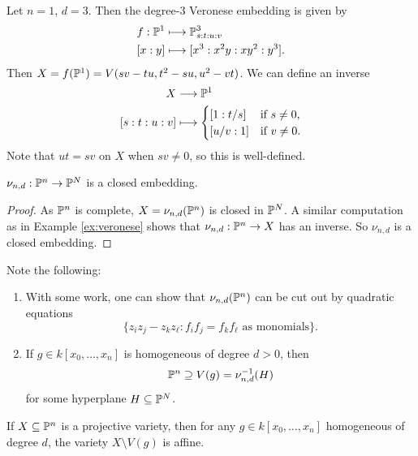 \begin{example}\label{ex:veronese}
  Let $n = 1$, $d = 3$. Then the degree-$3$
  Veronese embedding is given by
  \begin{align*}
    f : \mathbb{P}^1 &\longmapsto \mathbb{P}^3_{s : t : u : v} \\
    [x : y] &\longmapsto [x^3 : x^2y : xy^2 : y^3].
  \end{align*}
  Then $X = f(\mathbb{P}^1) = V(sv - tu, t^2 - su, u^2 - vt)$.
  We can define an inverse
  \begin{align*}
    X &\longrightarrow \mathbb{P}^1 \\
    [s : t : u : v] &\longmapsto
    \begin{cases}
      [1 : t / s] & \text{if } s \ne 0, \\
      [u / v : 1] & \text{if } v \ne 0.
    \end{cases}
  \end{align*}
  Note that $ut = sv$ on $X$ when
  $sv \ne 0$, so this is well-defined.
\end{example}

\begin{prop}
  $\nu_{n, d} : \mathbb{P}^n \to \mathbb{P}^N$ is a
  closed embedding.
\end{prop}

\begin{proof}
  As $\mathbb{P}^n$ is complete,
  $X = \nu_{n, d}(\mathbb{P}^n)$ is closed in
  $\mathbb{P}^N$. A similar computation as
  in Example \ref{ex:veronese} shows that
  $\nu_{n, d} : \mathbb{P}^n \to X$ has
  an inverse. So $\nu_{n, d}$ is a
  closed embedding.
\end{proof}

\begin{remark}
  Note the following:
  \begin{enumerate}
    \item With some work, one can show that
      $\nu_{n, d}(\mathbb{P}^n)$ can be cut out
      by quadratic equations
      \[
        \{
          z_i z_j - z_k z_\ell :
          f_i f_j = f_k f_\ell
          \text{ as monomials}
        \}.
      \]
    \item If $g \in k[x_0, \ldots, x_n]$
      is homogeneous of degree $d > 0$, then
      \[
        \mathbb{P}^n \supseteq
        V(g)
        = \nu_{n, d}^{-1}(H)
      \]
      for some hyperplane $H \subseteq \mathbb{P}^N$.
  \end{enumerate}
\end{remark}

\begin{theorem}
  If $X \subseteq \mathbb{P}^n$ is a projective
  variety, then for any
  $g \in k[x_0, \ldots, x_n]$ homogeneous of
  degree $d$, the variety
  $X \setminus V(g)$ is affine.
\end{theorem}

